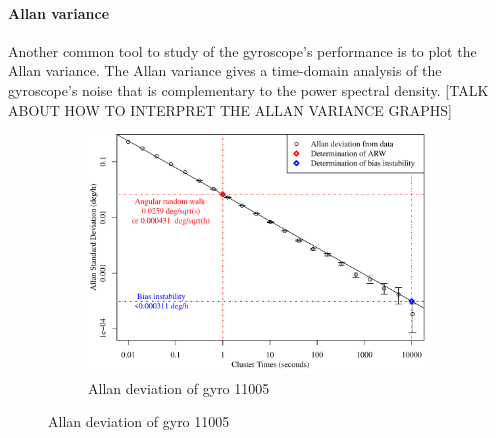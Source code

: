 \paragraph{Allan variance}


Another common tool to study of the gyroscope's performance is to plot the Allan variance. The Allan variance gives a time-domain analysis of the gyroscope's noise that is complementary to the power spectral density. [TALK ABOUT HOW TO INTERPRET THE ALLAN VARIANCE GRAPHS]
\begin{figure}[!ht]

	\begin{subfigure}[b]{\textwidth}
		\centering
		\includegraphics[width=0.98\textwidth]{Figures/allandev_11005.pdf} 
		\caption{Allan deviation of gyro 11005}
		\label{subfig:allan11005}
	\end{subfigure}
	

\end{figure}
